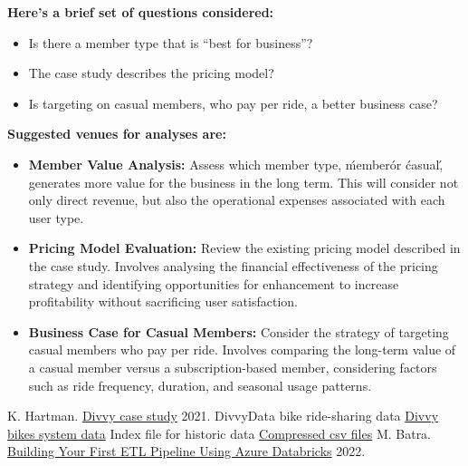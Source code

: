 \documentclass[12pt, a4paper]{article}
\begin{document}
        \textbf{Here's a brief set of questions considered:}
            \begin{itemize}
                \item Is there a member type that is “best for business”?
                \item The case study describes the pricing model?
                \item Is targeting on casual members, who pay per ride, a better business case?
            \end{itemize}
        \textbf{Suggested venues for analyses are:}
            \begin{itemize}
            \item \textbf{Member Value Analysis:} Assess which member type, \'member\' or \'casual\', generates more value for the business in the long term.
            This will consider not only direct revenue, but also the operational expenses associated with each user type.
            \item \textbf{Pricing Model Evaluation:} Review the existing pricing model described in the case study.
            Involves analysing the financial effectiveness of the pricing strategy and identifying opportunities for enhancement to increase profitability without sacrificing user satisfaction.
            \item \textbf{Business Case for Casual Members:} Consider the strategy of targeting casual members who pay per ride.
            Involves comparing the long-term value of a casual member versus a subscription-based member, considering factors such as ride frequency, duration, and seasonal usage patterns.
            \end{itemize}

    \begin{thebibliography}{9}
     K. Hartman. \href{https://artscience.blog/home/divvy-dataviz-case-study}{Divvy case study}\/  2021.
     DivvyData bike ride-sharing data \href{https://divvybikes.com/system-data}{Divvy bikes system data}\/
     Index file for historic data \href{https://divvy-tripdata.s3.amazonaws.com/index.html}{Compressed csv files}\/
     M. Batra. \href{https://app.pluralsight.com/library/courses/building-etl-pipeline-microsoft-azure-databricks/table-of-contents}{Building Your First ETL Pipeline Using Azure Databricks}\/ 2022.
\end{thebibliography}
\end{document}
